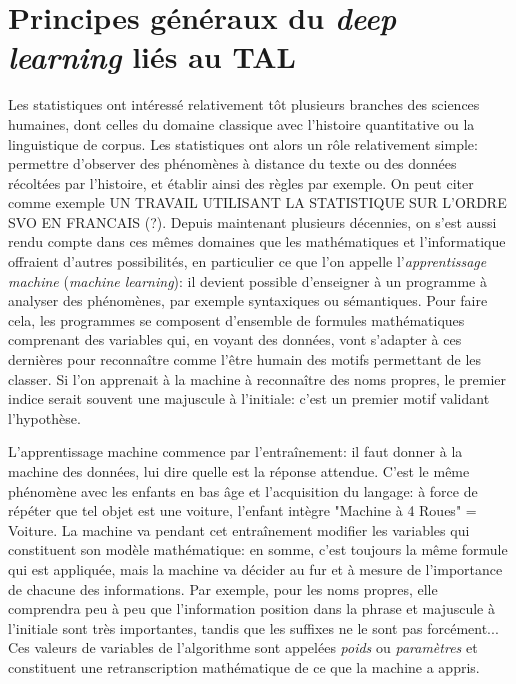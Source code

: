 \section{Principes généraux du \textit{deep learning} liés au TAL}

Les statistiques ont intéressé relativement tôt plusieurs branches des sciences humaines, dont celles du domaine classique avec l'histoire quantitative ou la linguistique de corpus. Les statistiques ont alors un rôle relativement simple: permettre d'observer des phénomènes à distance du texte ou des données récoltées par l'histoire, et établir ainsi des règles par exemple. On peut citer comme exemple UN TRAVAIL UTILISANT LA STATISTIQUE SUR L'ORDRE SVO EN FRANCAIS (?). Depuis maintenant plusieurs décennies, on s'est aussi rendu compte dans ces mêmes domaines que les mathématiques et l'informatique offraient d'autres possibilités, en particulier ce que l'on appelle l'\textit{apprentissage machine} (\textit{machine learning}): il devient possible d'enseigner à un programme à analyser des phénomènes, par exemple syntaxiques ou sémantiques. Pour faire cela, les programmes se composent d'ensemble de formules mathématiques comprenant des variables qui, en voyant des données, vont s'adapter à ces dernières pour reconnaître comme l'être humain des motifs permettant de les classer. Si l'on apprenait à la machine à reconnaître des noms propres, le premier indice serait souvent une majuscule à l'initiale: c'est un premier motif validant l'hypothèse.

L'apprentissage machine commence par l'entraînement: il faut donner à la machine des données, lui dire quelle est la réponse attendue. C'est le même phénomène avec les enfants en bas âge et l'acquisition du langage: à force de répéter que tel objet est une voiture, l'enfant intègre "Machine à 4 Roues" = Voiture. La machine va pendant cet entraînement modifier les variables qui constituent son modèle mathématique: en somme, c'est toujours la même formule qui est appliquée, mais la machine va décider au fur et à mesure de l'importance de chacune des informations. Par exemple, pour les noms propres, elle comprendra peu à peu que l'information position dans la phrase et majuscule à l'initiale sont très importantes, tandis que les suffixes ne le sont pas forcément... Ces valeurs de variables de l'algorithme sont appelées \textit{poids} ou \textit{paramètres} et constituent une retranscription mathématique de ce que la machine a appris. 

